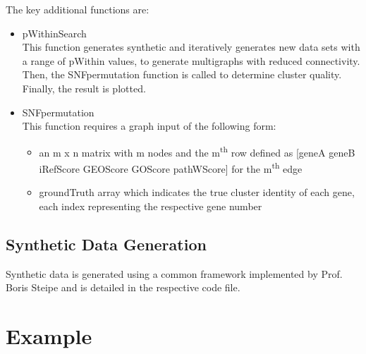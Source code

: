 \documentclass[doublespaced, 12pt]{article}
\begin{document}
The key additional functions are:
\begin{itemize}
	\item pWithinSearch \\ This function generates synthetic and iteratively generates new data sets with a range of pWithin values, to generate multigraphs with reduced connectivity. Then, the SNFpermutation function is called to determine cluster quality. Finally, the result is plotted.
	\item SNFpermutation \\ This function requires a graph input of the following form: 
	\begin{itemize}
		\item an m x n matrix with m nodes and the m\textsuperscript{th} row defined as [geneA geneB iRefScore GEOScore GOScore pathWScore] for the m\textsuperscript{th} edge
		\item groundTruth array which indicates the true cluster identity of each gene, each index representing the respective gene number 
	\end{itemize} 
\end{itemize}


\subsection{Synthetic Data Generation}
Synthetic data is generated using a common framework implemented by Prof. Boris Steipe and is detailed in the respective code file.

\section{Example}


\end{document}
